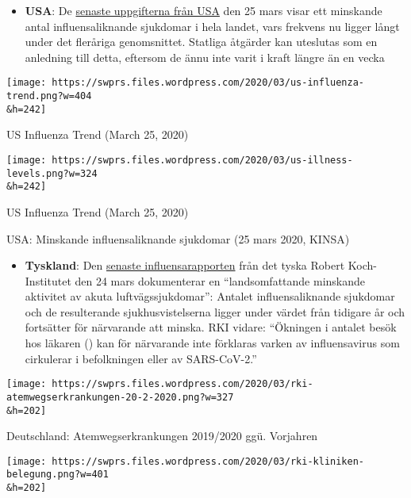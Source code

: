 \begin{itemize}
\tightlist
\item
  \textbf{USA}: De \href{https://healthweather.us/}{senaste uppgifterna
  från USA} den 25 mars visar ett minskande antal influensaliknande
  sjukdomar i hela landet, vars frekvens nu ligger långt under det
  fleråriga genomsnittet. Statliga åtgärder kan uteslutas som en
  anledning till detta, eftersom de ännu inte varit i kraft längre än en
  vecka
\end{itemize}

\href{https://swprs.org/covid-19-hinweis-ii/us-influenza-trend/}{}

\texttt{[image: https://swprs.files.wordpress.com/2020/03/us-influenza-trend.png?w=404\\\&h=242]}

US Influenza Trend (March 25, 2020)

\href{https://swprs.org/covid-19-hinweis-ii/us-illness-levels/}{}

\texttt{[image: https://swprs.files.wordpress.com/2020/03/us-illness-levels.png?w=324\\\&h=242]}

US Influenza Trend (March 25, 2020)

USA: Minskande influensaliknande sjukdomar (25 mars 2020, KINSA)

\begin{itemize}
\tightlist
\item
  \textbf{Tyskland}: Den
  \href{https://influenza.rki.de/Wochenberichte/2019_2020/2020-12.pdf}{senaste
  influensarapporten} från det tyska Robert Koch-Institutet den 24 mars
  dokumenterar en ``landsomfattande minskande aktivitet av akuta
  luftvägssjukdomar'': Antalet influensaliknande sjukdomar och de
  resulterande sjukhusvistelserna ligger under värdet från tidigare år
  och fortsätter för närvarande att minska. RKI vidare: ``Ökningen i
  antalet besök hos läkaren () kan för närvarande inte förklaras varken
  av influensavirus som cirkulerar i befolkningen eller av SARS-CoV-2.''
\end{itemize}

\href{https://swprs.org/covid-19-hinweis-ii/rki-atemwegserkrankungen-20-2-2020/}{}

\texttt{[image: https://swprs.files.wordpress.com/2020/03/rki-atemwegserkrankungen-20-2-2020.png?w=327\\\&h=202]}

Deutschland: Atemwegserkrankungen 2019/2020 ggü. Vorjahren

\href{https://swprs.org/covid-19-hinweis-ii/rki-kliniken-belegung/}{}

\texttt{[image: https://swprs.files.wordpress.com/2020/03/rki-kliniken-belegung.png?w=401\\\&h=202]}

